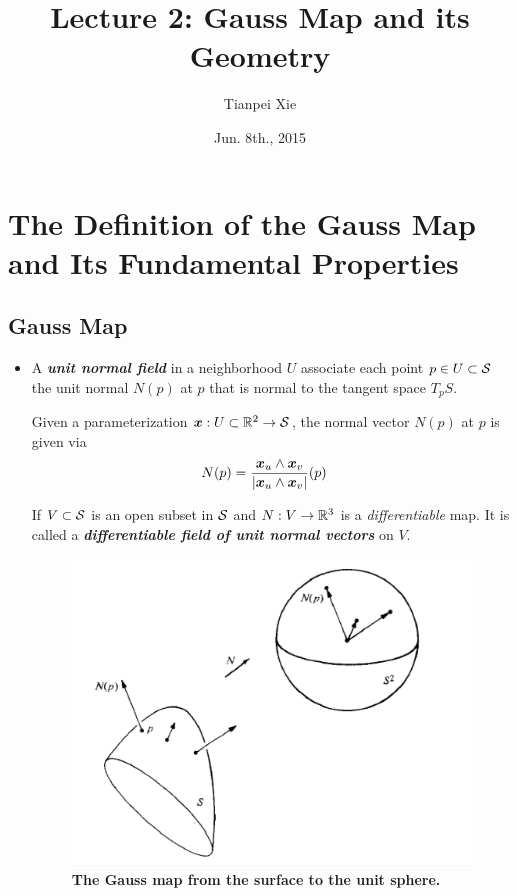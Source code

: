 \documentclass[11pt]{article}
\begin{document}
\title{Lecture 2: Gauss Map and its Geometry}
\author{ Tianpei Xie}
\date{ Jun. 8th., 2015 }
\maketitle
\tableofcontents
\newpage
\section{The Definition of the Gauss Map and Its Fundamental Properties}
\subsection{Gauss Map}
\begin{itemize}
\item A \emph{\textbf{unit normal field}} in a neighborhood $U$ associate each point $p\in U\subset {\mathcal S}$ the unit normal $N(p)$ at $p$ that is normal to the tangent space $T_{p}S$.

Given a parameterization $\boldsymbol{x}: U\subset {\mathbb R}^{2} \rightarrow {\mathcal S}$, the normal vector $N(p)$ at $p$ is given via
\begin{align*}
N(p) &= \frac{\boldsymbol{x}_{u} \wedge \boldsymbol{x}_{v}}{\left\lvert \boldsymbol{x}_{u} \wedge \boldsymbol{x}_{v} \right\rvert}(p)
\end{align*}

If $V\subset {\mathcal S}$ is an open subset in ${\mathcal S}$ and $N: V\rightarrow {\mathbb R}^{3}$ is a \emph{differentiable} map. It is called a \emph{\textbf{differentiable field of unit normal vectors}} on $V$.

\begin{figure}[thb]
\centering
\begin{minipage}{0.5\linewidth}
 \centerline{\includegraphics[scale = 0.5]{gauss_map.png}}
\end{minipage}
\caption{\scriptsize \textbf{The Gauss map from the surface to the unit sphere.}}
\end{figure}


\end{itemize}
\end{document}
